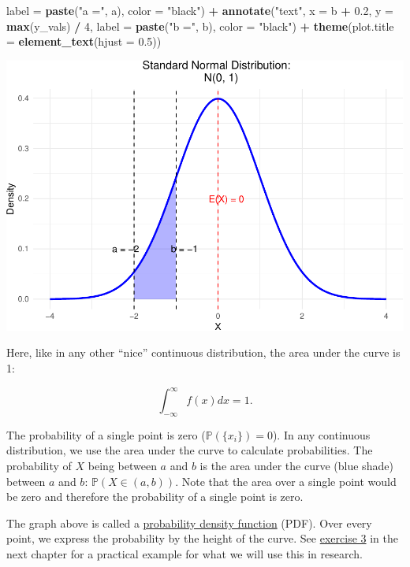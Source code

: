 \documentclass[
]{book}
\newenvironment{Shaded}{\begin{snugshade}}{\end{snugshade}}
\newcommand{\AttributeTok}[1]{\textcolor[rgb]{0.13,0.29,0.53}{#1}}
\newcommand{\DecValTok}[1]{\textcolor[rgb]{0.00,0.00,0.81}{#1}}
\newcommand{\FloatTok}[1]{\textcolor[rgb]{0.00,0.00,0.81}{#1}}
\newcommand{\FunctionTok}[1]{\textcolor[rgb]{0.13,0.29,0.53}{\textbf{#1}}}
\newcommand{\NormalTok}[1]{#1}
\newcommand{\SpecialCharTok}[1]{\textcolor[rgb]{0.81,0.36,0.00}{\textbf{#1}}}
\newcommand{\StringTok}[1]{\textcolor[rgb]{0.31,0.60,0.02}{#1}}
\newcommand{\pandocbounded}[1]{#1}
\begin{document}
\begin{Shaded}
\begin{Highlighting}[]
           \AttributeTok{label =} \FunctionTok{paste}\NormalTok{(}\StringTok{"a ="}\NormalTok{, a), }\AttributeTok{color =} \StringTok{"black"}\NormalTok{) }\SpecialCharTok{+}
  \FunctionTok{annotate}\NormalTok{(}\StringTok{"text"}\NormalTok{, }\AttributeTok{x =}\NormalTok{ b }\SpecialCharTok{+} \FloatTok{0.2}\NormalTok{, }\AttributeTok{y =} \FunctionTok{max}\NormalTok{(y\_vals) }\SpecialCharTok{/} \DecValTok{4}\NormalTok{,}
           \AttributeTok{label =} \FunctionTok{paste}\NormalTok{(}\StringTok{"b ="}\NormalTok{, b), }\AttributeTok{color =} \StringTok{"black"}\NormalTok{) }\SpecialCharTok{+}
  \FunctionTok{theme}\NormalTok{(}\AttributeTok{plot.title =} \FunctionTok{element\_text}\NormalTok{(}\AttributeTok{hjust =} \FloatTok{0.5}\NormalTok{))}
\end{Highlighting}
\end{Shaded}

\pandocbounded{\includegraphics[keepaspectratio]{_main_files/figure-latex/unnamed-chunk-16-1.pdf}}

Here, like in any other ``nice'' continuous distribution, the area under the curve is 1:

\[\int_{-\infty}^{\infty} f(x) dx = 1.\]

The probability of a single point is zero (\(\mathbb{P}(\{ x_i \}) = 0\)).
In any continuous distribution, we use the area under the curve to calculate probabilities. The probability of \(X\) being between \(a\) and \(b\) is the area under the curve (blue shade) between \(a\) and \(b\):
\(\mathbb{P}(X \in (a,b))\). Note that the area over a single point would be zero and therefore the probability of a single point is zero.

The graph above is called a \href{https://en.wikipedia.org/wiki/Probability_density_function}{probability density function} (PDF).
Over every point, we express the probability by the height of the curve.
See \hyperref[exercise3_descriptive_stats]{exercise 3} in the next chapter for a practical example for what we will use this in research.
\end{document}
